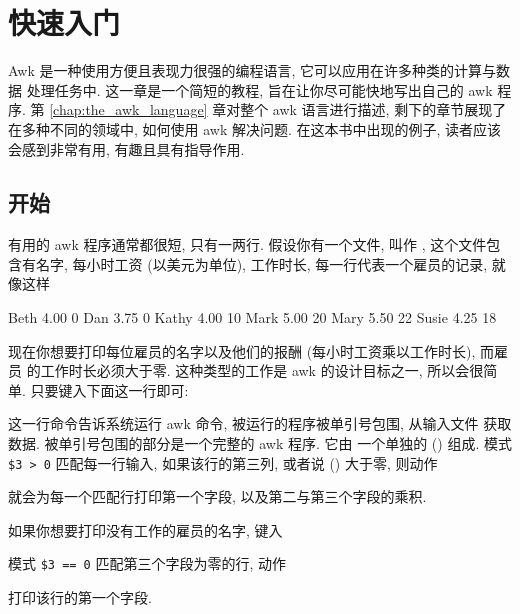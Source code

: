 
\chapter{快速入门}
\label{chap:an_awk_tutorial}

Awk 是一种使用方便且表现力很强的编程语言, 它可以应用在许多种类的计算与数据
处理任务中. 这一章是一个简短的教程, 旨在让你尽可能快地写出自己的 awk 程序.
第 \ref{chap:the_awk_language} 章对整个 awk 语言进行描述, 剩下的章节展现了
在多种不同的领域中, 如何使用 awk 解决问题. 在这本书中出现的例子, 读者应该
会感到非常有用, 有趣且具有指导作用.

\section{开始}
\label{sec:getting_started}

有用的 awk 程序通常都很短, 只有一两行. 假设你有一个文件, 叫作
, 这个文件包含有名字, 每小时工资 (以美元为单位),
工作时长, 每一行代表一个雇员的记录, 就像这样
\begin{file}
    Beth    4.00    0
    Dan     3.75    0
    Kathy   4.00    10
    Mark    5.00    20
    Mary    5.50    22
    Susie   4.25    18
\end{file}
现在你想要打印每位雇员的名字以及他们的报酬 (每小时工资乘以工作时长), 而雇员
的工作时长必须大于零. 这种类型的工作是 awk 的设计目标之一, 所以会很简单.
只要键入下面这一行即可:
这一行命令告诉系统运行 awk 命令, 被运行的程序被单引号包围, 从输入文件
 获取数据. 被单引号包围的部分是一个完整的 awk 程序. 它由
一个单独的  () 组成.
模式 \verb'$3 > 0' 匹配每一行输入, 如果该行的第三列, 或者说 
() 大于零, 则动作
就会为每一个匹配行打印第一个字段, 以及第二与第三个字段的乘积.

如果你想要打印没有工作的雇员的名字, 键入
模式 \verb'$3 == 0' 匹配第三个字段为零的行, 动作
打印该行的第一个字段.


